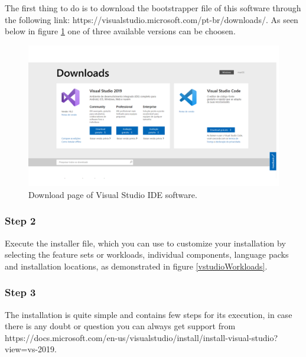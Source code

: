 \begin{refsection}
The first thing to do is to download the bootstrapper file of this software through the following link: https://visualstudio.microsoft.com/pt-br/downloads/. As seen below in figure \ref{vstudio} one of three available versions can be choosen.

\begin{figure}[H]
	\centering
	\includegraphics[width=1\linewidth]{./sdf/arduino_quantum_rx/figures/vsDownload.pdf}
	\caption{Download page of Visual Studio IDE software.}
	\label{vstudio}
\end{figure}


\subsubsection{Step 2}

Execute the installer file, which you can use to customize your installation by selecting the feature sets or workloads, individual components, language packs and installation locations, as demonstrated in figure \ref{vstudioWorkloads}. 



\subsubsection{Step 3}

The installation is quite simple and contains few steps for its execution, in case there is any doubt or question you can always get support from https://docs.microsoft.com/en-us/visualstudio/install/install-visual-studio?view=vs-2019.


\end{refsection}
